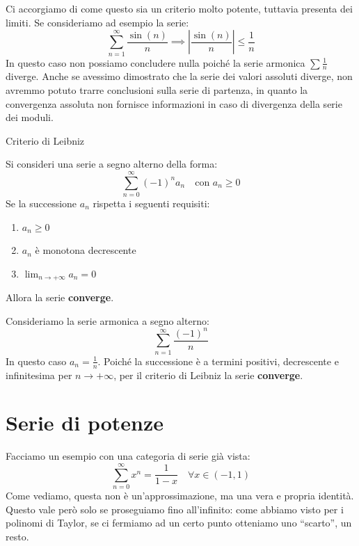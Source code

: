 \documentclass[12pt]{report}
\begin{document}
	Ci accorgiamo di come questo sia un criterio molto potente, tuttavia presenta dei limiti. Se consideriamo ad esempio la serie:
	\[
	\sum_{n=1}^{\infty} \frac{\sin(n)}{n} \implies \left| \frac{\sin(n)}{n} \right| \le \frac{1}{n}
	\]
	In questo caso non possiamo concludere nulla poiché la serie armonica $\sum \frac{1}{n}$ diverge. Anche se avessimo dimostrato che la serie dei valori assoluti diverge, non avremmo potuto trarre conclusioni sulla serie di partenza, in quanto la convergenza assoluta non fornisce informazioni in caso di divergenza della serie dei moduli.
	
	\begin{teorema}{Criterio di Leibniz}{}
		
		Si consideri una serie a segno alterno della forma:
		\[
		\sum_{n=0}^{\infty} (-1)^n a_n \quad \text{con } a_n \ge 0
		\]
		Se la successione $a_n$ rispetta i seguenti requisiti:
		\begin{enumerate}
			
			\item $a_n \ge 0$
			
			\item $a_n$ è monotona decrescente
			
			\item $\lim_{n \to +\infty} a_n = 0$
			
		\end{enumerate}
		Allora la serie \textbf{converge}.
		
	\end{teorema}
	
	\begin{osservazione}{}{}
		
		Consideriamo la serie armonica a segno alterno:
		\[
		\sum_{n=1}^{\infty} \frac{(-1)^n}{n}
		\]
		In questo caso $a_n = \frac{1}{n}$. Poiché la successione è a termini positivi, decrescente e infinitesima per $n \to +\infty$, per il criterio di Leibniz la serie \textbf{converge}.
		
	\end{osservazione}
	
	\chapter{Serie di potenze}
	
	Facciamo un esempio con una categoria di serie già vista:
	\[
	\sum_{n=0}^{\infty} x^n = \frac{1}{1-x} \quad \forall x \in (-1,1)
	\]
	Come vediamo, questa non è un'approssimazione, ma una vera e propria identità. Questo vale però solo se proseguiamo fino all'infinito: come abbiamo visto per i polinomi di Taylor, se ci fermiamo ad un certo punto otteniamo uno ``scarto'', un resto.
	
\end{document}
